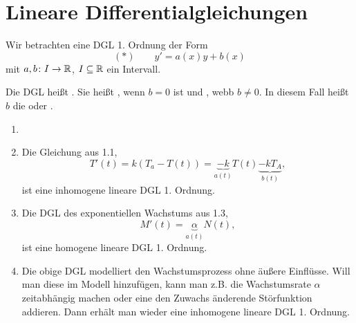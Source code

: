 \chapter{Lineare Differentialgleichungen}
Wir betrachten eine DGL 1. Ordnung der Form
\[ (\ast)\qquad y'=a(x)y+b(x) \]
mit $ a,b\colon I\rightarrow\mathbb{R} $, $ I\subseteq\mathbb{R} $ ein Intervall.
\begin{definition}
	Die DGL hei\ss t . Sie hei\ss t , wenn $ b=0 $ ist und , webb $ b\neq 0 $. In diesem Fall hei\ss t $ b $ die  oder .
\end{definition}
\begin{beispiel}
	\begin{enumerate}
		\item[]
		\item Die Gleichung aus 1.1, \[ T'(t)=k(T_a-T(t))=\underbrace{-k}_{a(t)}T(t)\underbrace{-kT_A}_{b(t)}, \]
		ist eine inhomogene lineare DGL 1. Ordnung.
		\item Die DGL des exponentiellen Wachstums aus 1.3,
		\[ M'(t)=\underbrace{\alpha}_{a(t)}N(t), \]
		ist eine homogene lineare DGL 1. Ordnung.
		\item Die obige DGL modelliert den Wachstumsprozess ohne \"au\ss ere Einfl\"usse. Will man diese im Modell hinzuf\"ugen, kann man z.B. die Wachstumsrate $ \alpha $ zeitabh\"angig machen oder eine den Zuwachs \"anderende St\"orfunktion addieren. Dann erh\"alt man wieder eine inhomogene lineare DGL 1. Ordnung.  
	\end{enumerate}
\end{beispiel}